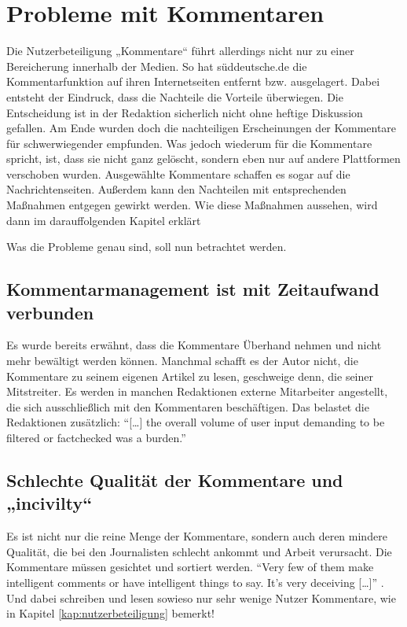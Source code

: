 \chapter{Probleme mit Kommentaren} \label{kap:probleme}

Die Nutzerbeteiligung „Kommentare“ führt allerdings nicht nur zu einer
Bereicherung innerhalb der Medien. So hat süddeutsche.de die Kommentarfunktion
auf ihren Internetseiten entfernt bzw. ausgelagert. Dabei entsteht der Eindruck,
dass die Nachteile die Vorteile überwiegen. Die Entscheidung ist in der
Redaktion sicherlich nicht ohne heftige Diskussion gefallen. Am Ende wurden doch
die nachteiligen Erscheinungen der Kommentare für schwerwiegender empfunden. Was
jedoch wiederum für die Kommentare spricht, ist, dass sie nicht ganz gelöscht,
sondern eben nur auf andere Plattformen verschoben wurden. Ausgewählte
Kommentare schaffen es sogar auf die Nachrichtenseiten. Außerdem kann den
Nachteilen mit entsprechenden Maßnahmen entgegen gewirkt werden. Wie diese
Maßnahmen aussehen, wird dann im darauffolgenden Kapitel erklärt

Was die Probleme genau sind, soll nun betrachtet werden.

\section{Kommentarmanagement ist mit Zeitaufwand verbunden}

Es wurde bereits erwähnt, dass die Kommentare Überhand nehmen und nicht mehr
bewältigt werden können. Manchmal schafft es der Autor nicht, die Kommentare zu
seinem eigenen Artikel zu lesen, geschweige denn, die seiner Mitstreiter. Es
werden in manchen Redaktionen externe Mitarbeiter angestellt, die sich
ausschließlich mit den Kommentaren beschäftigen. Das belastet die Redaktionen
zusätzlich: ``[\ldots] the overall volume of user input demanding to be filtered
or factchecked was a burden.'' \autocite[S.~172]{quandt}


\section{Schlechte Qualität der Kommentare und „incivilty“}

Es ist nicht nur die reine Menge der Kommentare, sondern auch deren mindere
Qualität, die bei den Journalisten schlecht ankommt und Arbeit verursacht. Die
Kommentare müssen gesichtet und sortiert werden. ``Very few of them make
intelligent comments or have intelligent things to say. It's very deceiving
[\ldots]'' \autocite[S.~ 103]{reich}. Und dabei schreiben und lesen sowieso nur
sehr wenige Nutzer Kommentare, wie in Kapitel \ref{kap:nutzerbeteiligung}
bemerkt!

